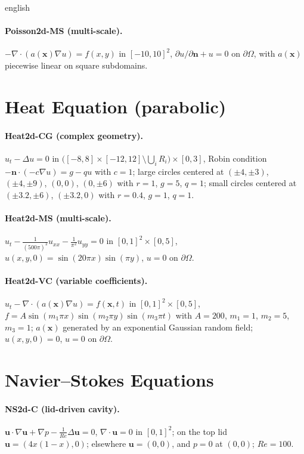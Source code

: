 \documentclass[0000.tex]{subfiles}
\begin{document}
\begin{hyphenrules}{english}
\paragraph{Poisson2d-MS (multi-scale).} $-\nabla\cdot(a(\mathbf{x})\nabla u)=f(x,y)$ in $[-10,10]^2$,
$\partial u/\partial\mathbf{n}+u=0$ on $\partial\Omega$, with $a(\mathbf{x})$ piecewise linear on square subdomains.

\section{Heat Equation (parabolic)}
\paragraph{Heat2d-CG (complex geometry).} $u_t-\Delta u=0$ in
$\big([-8,8]\times[-12,12]\setminus\bigcup_iR_i\big)\times[0,3]$, Robin condition
$-\mathbf{n}\cdot(-c\nabla u)=g-qu$ with $c=1$; large circles centered at $(\pm4,\pm3)$, $(\pm4,\pm9)$, $(0,0)$,
$(0,\pm6)$ with $r=1$, $g=5$, $q=1$; small circles centered at $(\pm3.2,\pm6)$, $(\pm3.2,0)$ with $r=0.4$,
$g=1$, $q=1$.

\paragraph{Heat2d-MS (multi-scale).} $u_t-\frac{1}{(500\pi)^2}u_{xx}-\frac{1}{\pi^2}u_{yy}=0$ in
$[0,1]^2\times[0,5]$, $u(x,y,0)=\sin(20\pi x)\sin(\pi y)$, $u=0$ on $\partial\Omega$.

\paragraph{Heat2d-VC (variable coefficients).} $u_t-\nabla\cdot(a(\mathbf{x})\nabla u)=f(\mathbf{x},t)$ in
$[0,1]^2\times[0,5]$, $f=A\sin(m_1\pi x)\sin(m_2\pi y)\sin(m_3\pi t)$ with $A=200$, $m_1=1$, $m_2=5$,
$m_3=1$; $a(\mathbf{x})$ generated by an exponential Gaussian random field; $u(x,y,0)=0$, $u=0$ on $\partial\Omega$.

\section{Navier--Stokes Equations}
\paragraph{NS2d-C (lid-driven cavity).} $\mathbf{u}\cdot\nabla\mathbf{u}+\nabla p-\frac{1}{Re}\Delta\mathbf{u}=0$,
$\nabla\cdot\mathbf{u}=0$ in $[0,1]^2$; on the top lid $\mathbf{u}=(4x(1-x),0)$; elsewhere $\mathbf{u}=(0,0)$,
and $p=0$ at $(0,0)$; $Re=100$.


\end{hyphenrules}
\end{document}
